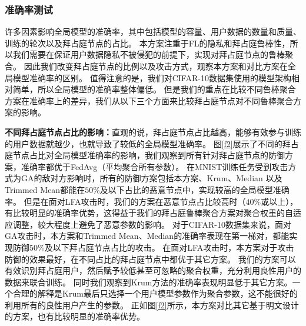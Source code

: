 \subsubsection{准确率测试}
许多因素影响全局模型的准确率，其中包括模型的容量、用户数据的数量和质量、训练的轮次以及拜占庭节点的占比。
本方案注重于FL的隐私和拜占庭鲁棒性，所以我们需要在保证用户数据隐私不被侵犯的前提下，实现对拜占庭节点的鲁棒聚合。
因此我们改变拜占庭节点的比例以及攻击方式，观察本方案和对比方案在全局模型准确率的区别。
值得注意的是，我们对CIFAR-10数据集使用的模型架构相对简单，所以全局模型的准确率整体偏低。
但是我们的重点在比较不同鲁棒聚合方案在准确率上的差异，我们从以下三个方面来比较拜占庭节点对不同鲁棒聚合方案的影响。

\textbf{不同拜占庭节点占比的影响：}直观的说，拜占庭节点占比越高，能够有效参与训练的用户数据就越少，也就导致了较低的全局模型准确率。
图\ref{f2}展示了不同的拜占庭节点占比对全局模型准确率的影响，我们观察到所有针对拜占庭节点的防御方案，准确率都优于FedAvg（平均聚合所有参数）。
在MNIST训练任务受到攻击方式为GA的敌对方影响时，所有的防御方案包括本方案、Krum、Median 以及 Trimmed Mean都能在$ 50\% $及以下占比的恶意节点中，实现较高的全局模型准确率。
但是在面对LFA攻击时，我们的方案在恶意节点占比较高时（$40\%$或以上），有比较明显的准确率优势，这得益于我们的拜占庭鲁棒聚合方案对聚合权重的自适应调整，较大程度上避免了恶意参数的影响。
对于CIFAR-10数据集来说，面对GA攻击时，本方案和Trimmed Mean、Median的准确率表现在第一梯对，都能实现防御$50\%$及以下拜占庭节点占比的攻击。
在面对LFA攻击时，本方案对于攻击防御的效果最好，在不同占比的拜占庭节点中都优于其它方案。
我们的方案可以有效识别拜占庭用户，然后赋予较低甚至可忽略的聚合权重，充分利用良性用户的数据来联合训练。
同时我们观察到Krum方法的准确率表现明显低于其它方案。一个合理的解释是Krum最后只选择一个用户模型参数作为聚合参数，这不能很好的利用所有的良性用户产生的参数。
正如图\ref{f2}所示，本方案对比其它基于明文设计的方案，也有比较明显的准确率优势。

